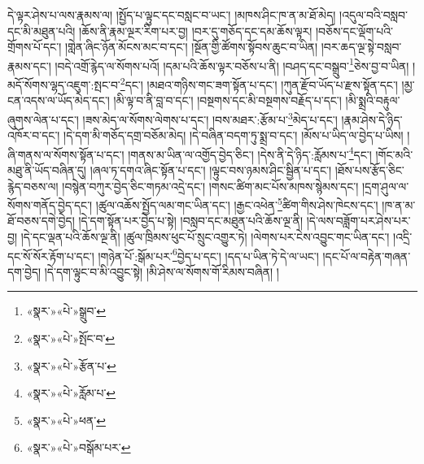 དེ་ལྟར་ཤེས་པ་ལས་རྣམས་ལ། །སྤྱོད་པ་ལྟུང་དང་བསླང་བ་ཡང་། །མཁས་ཤིང་ཁ་ན་མ་ཐོ་མེད། །འདུལ་བའི་བསླབ་དང་མི་མཐུན་པའི། །ཆོས་ནི་རྣམ་ལྔར་རིག་པར་བྱ། །བར་དུ་གཅོད་དང་དམ་ཆོས་ལྟར། །བཅོས་དང་ལྡོག་པའི་གྲོགས་པོ་དང་། །གླེན་ཞིང་ཉོན་མོངས་མང་བ་དང་། །སྔོན་གྱི་ཚོགས་སྟོབས་ཆུང་བ་ཡིན། །བར་ཆད་ལྔ་སྟེ་བསླབ་རྣམས་དང་། །བདེ་འགྲོ་རྙེད་ལ་སོགས་པའོ། །དམ་པའི་ཆོས་ལྟར་བཅོས་པ་ནི། །བཤད་དང་བསྒྲུབ་\footnote{«སྣར་»«པེ་»སྒྲུབ་}ཅེས་བྱ་བ་ཡིན། །མདོ་སོགས་ལྷད་འཇུག་:སྤང་བ་\footnote{«སྣར་»«པེ་»སྤོང་བ་}དང་། །མཐའ་གཉིས་གང་ཟག་སྟོན་པ་དང་། །ཀུན་རྫོབ་ཡོད་པ་རྫས་སྟོན་དང་། །མྱ་ངན་འདས་ལ་ཡོད་མེད་དང་། །མི་ལྟ་བ་ནི་བླ་བ་དང་། །བསྔགས་དང་མི་བསྔགས་བརྗོད་པ་དང་། །མི་སྨྲའི་བརྟུལ་ཞུགས་ལེན་པ་དང་། །ཟས་མེད་ལ་སོགས་ལེགས་པ་དང་། །བས་མཐར་:རྩོམ་པ་\footnote{«སྣར་»«པེ་»རྩོན་པ་}མེད་པ་དང་། །རྣམ་ཤེས་དེ་ཉིད་འཁོར་བ་དང་། །དེ་དག་མི་གཅོད་དགྲ་བཅོམ་མེད། །དེ་བཞིན་བདག་ཏུ་སྨྲ་བ་དང་། །མོས་པ་ཡིད་ལ་བྱེད་པ་ཡིས། །ཞི་གནས་ལ་སོགས་སྟོན་པ་དང་། །གནས་མ་ཡིན་ལ་འགྱོད་བྱེད་ཅིང་། །དེས་ནི་དེ་ཉིད་:རློམས་པ་\footnote{«སྣར་»«པེ་»རློམ་པ་}དང་། །གོང་མའི་མཐུ་ནི་ཡོད་བཞིན་དུ། །ཞལ་ཏ་དགའ་ཞིང་སྟོན་པ་དང་། །ལྟུང་བས་ཉམས་ཤིང་སྦྱིན་པ་དང་། །ཐོས་པས་རྩོད་ཅིང་རྙེད་བཅས་ལ། །བསྙེན་བཀུར་བྱེད་ཅིང་གཏམ་འདྲེ་དང་། །གསང་ཚིག་མང་པོས་མཁས་སྙེམས་དང་། །དྲག་ཤུལ་ལ་སོགས་གནོད་བྱེད་དང་། །ཚུལ་འཆོས་སྤྱོད་ལམ་གང་ཡིན་དང་། །རྒྱང་འཕེན་\footnote{«སྣར་»«པེ་»ཕན་}ཚིག་གིས་ཤེས་ཁེངས་དང་། །ཁ་ན་མ་ཐོ་བཅས་དགེ་བྱེད། །དེ་དག་སྟོན་པར་བྱེད་པ་སྟེ། །བསླབ་དང་མཐུན་པའི་ཆོས་ལྔ་ནི། །དེ་ལས་བཟློག་པར་ཤེས་པར་བྱ། །དེ་དང་ལྡན་པའི་ཆོས་ལྔ་ནི། །ཚུལ་ཁྲིམས་ཕུང་པོ་སྲུང་འགྱུར་ཏེ། །ལེགས་པར་ངེས་འབྱུང་གང་ཡིན་དང་། །འདྲི་དང་སོ་སོར་རྟོག་པ་དང་། །གཉེན་པོ་:སྒོམ་པར་\footnote{«སྣར་»«པེ་»བསྒོམ་པར་}བྱེད་པ་དང་། །དད་པ་ཡིན་ཏེ་དེ་ལ་ཡང་། །དང་པོ་ལ་བརྟེན་གཞན་དག་བྱེད། །དེ་དག་ལྟུང་བ་མི་འབྱུང་སྟེ། །མི་ཤེས་ལ་སོགས་གོ་རིམས་བཞིན། །
